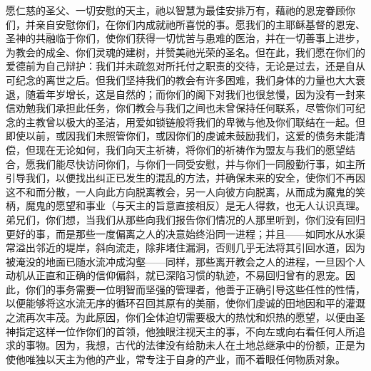 \par

愿仁慈的圣父、一切安慰的天主，祂以智慧为最佳安排万有，藉祂的恩宠眷顾你们，并亲自安慰你们，在你们内成就祂所喜悦的事。愿我们的主耶稣基督的恩宠、圣神的共融临于你们，使你们获得一切忧苦与患难的医治，并在一切善事上进步，为教会的成全、你们灵魂的建树，并赞美祂光荣的圣名。但在此，我们愿在你们的爱德前为自己辩护：我们并未疏忽对所托付之职责的交待，无论是过去，还是自从可纪念的离世之后。但我们坚持我们的教会有许多困难，我们身体的力量也大大衰退，随着年岁增长，这是自然的；而你们的阁下对我们也很怠慢，因为没有一封来信劝勉我们承担此任务，你们教会与我们之间也未曾保持任何联系，尽管你们可纪念的主教曾以极大的圣洁，用爱如锁链般将我们的卑微与他及你们联结在一起。但即使以前，或因我们未照管你们，或因你们的虔诚未鼓励我们，这爱的债务未能清偿，但现在无论如何，我们向天主祈祷，将你们的祈祷作为盟友与我们的愿望结合，愿我们能尽快访问你们，与你们一同受安慰，并与你们一同殷勤行事，如主所引导我们，以便找出纠正已发生的混乱的方法，并确保未来的安全，使你们不再因这不和而分散，一人向此方向脱离教会，另一人向彼方向脱离，从而成为魔鬼的笑柄，魔鬼的愿望和事业（与天主的旨意直接相反）是无人得救，也无人认识真理。弟兄们，你们想，当我们从那些向我们报告你们情况的人那里听到，你们没有回归更好的事，而是那些一度偏离之人的决意始终沿同一进程；并且——如同水从水渠常溢出邻近的堤岸，斜向流走，除非堵住漏洞，否则几乎无法将其引回水道，因为被淹没的地面已随水流冲成沟壑——同样，那些离开教会之人的进程，一旦因个人动机从正直和正确的信仰偏斜，就已深陷习惯的轨迹，不易回归曾有的恩宠。因此，你们的事务需要一位明智而坚强的管理者，他善于正确引导这些任性的性情，以便能够将这水流无序的循环召回其原有的美丽，使你们虔诚的田地因和平的灌溉之流再次丰茂。为此原因，你们全体迫切需要极大的热忱和炽热的愿望，以便由圣神指定这样一位作你们的首领，他独眼注视天主的事，不向左或向右看任何人所追求的事物。因为，我想，古代的法律没有给肋未人在土地总继承中的份额，正是为使他唯独以天主为他的产业，常专注于自身的产业，而不着眼任何物质对象。\par

\par


